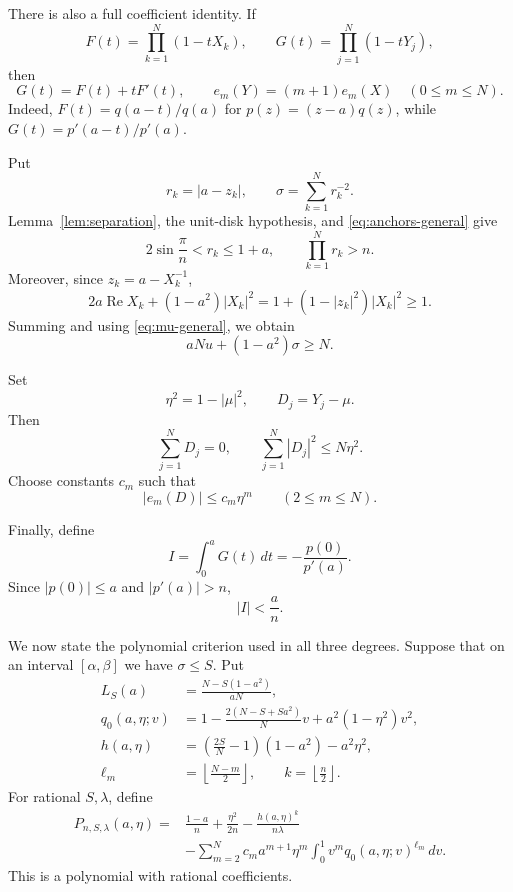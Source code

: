 \documentclass[11pt]{article}
\theoremstyle{remark}
\newcommand{\Rea}{\operatorname{Re}}
\begin{document}
There is also a full coefficient identity.  If
\[
 F(t)=\prod_{k=1}^N(1-tX_k),
 \qquad
 G(t)=\prod_{j=1}^N(1-tY_j),
\]
then
\begin{equation}\label{eq:F-G}
 G(t)=F(t)+tF'(t),
 \qquad
 e_m(Y)=(m+1)e_m(X)\quad(0\le m\le N).
\end{equation}
Indeed, $F(t)=q(a-t)/q(a)$ for $p(z)=(z-a)q(z)$, while
$G(t)=p'(a-t)/p'(a)$.

Put
\[
 r_k=|a-z_k|,
 \qquad
 \sigma=\sum_{k=1}^N r_k^{-2}.
\]
Lemma~\ref{lem:separation}, the unit-disk hypothesis, and
\eqref{eq:anchors-general} give
\begin{equation}\label{eq:annulus-product-general}
 2\sin\frac\pi n<r_k\le1+a,
 \qquad
 \prod_{k=1}^Nr_k>n.
\end{equation}
Moreover, since $z_k=a-X_k^{-1}$,
\[
 2a\Rea X_k+(1-a^2)|X_k|^2
 =1+(1-|z_k|^2)|X_k|^2\ge1.
\]
Summing and using \eqref{eq:mu-general}, we obtain
\begin{equation}\label{eq:localization-general}
 aNu+(1-a^2)\sigma\ge N.
\end{equation}

Set
\[
 \eta^2=1-|\mu|^2,
 \qquad
 D_j=Y_j-\mu.
\]
Then
\begin{equation}\label{eq:variance-general}
 \sum_{j=1}^ND_j=0,
 \qquad
 \sum_{j=1}^N|D_j|^2\le N\eta^2.
\end{equation}
Choose constants $c_m$ such that
\begin{equation}\label{eq:cm-general}
 |e_m(D)|\le c_m\eta^m
 \qquad(2\le m\le N).
\end{equation}

Finally, define
\begin{equation}\label{eq:I-general}
 I=\int_0^aG(t)\,dt=-\frac{p(0)}{p'(a)}.
\end{equation}
Since $|p(0)|\le a$ and $|p'(a)|>n$,
\begin{equation}\label{eq:I-upper-general}
 |I|<\frac an.
\end{equation}

We now state the polynomial criterion used in all three degrees.  Suppose that
on an interval $[\alpha,\beta]$ we have $\sigma\le S$.  Put
\begin{align}
 L_S(a)&=\frac{N-S(1-a^2)}{aN},\label{eq:LS}\\
 q_0(a,\eta;v)&=
 1-\frac{2(N-S+Sa^2)}N v+a^2(1-\eta^2)v^2,\label{eq:q0}\\
 h(a,\eta)&=
 \left(\frac{2S}{N}-1\right)(1-a^2)-a^2\eta^2,
 \label{eq:h-general}\\
 \ell_m&=\left\lfloor\frac{N-m}{2}\right\rfloor,
 \qquad
 k=\left\lfloor\frac n2\right\rfloor.
\end{align}
For rational $S,\lambda$, define
\begin{equation}\label{eq:Pfull}
\begin{split}
 P_{n,S,\lambda}(a,\eta)
 ={}&\frac{1-a}{n}+\frac{\eta^2}{2n}
 -\frac{h(a,\eta)^k}{n\lambda}\\
 &-\sum_{m=2}^N c_m a^{m+1}\eta^m
 \int_0^1v^m q_0(a,\eta;v)^{\ell_m}\,dv.
\end{split}
\end{equation}
This is a polynomial with rational coefficients.
\end{document}
